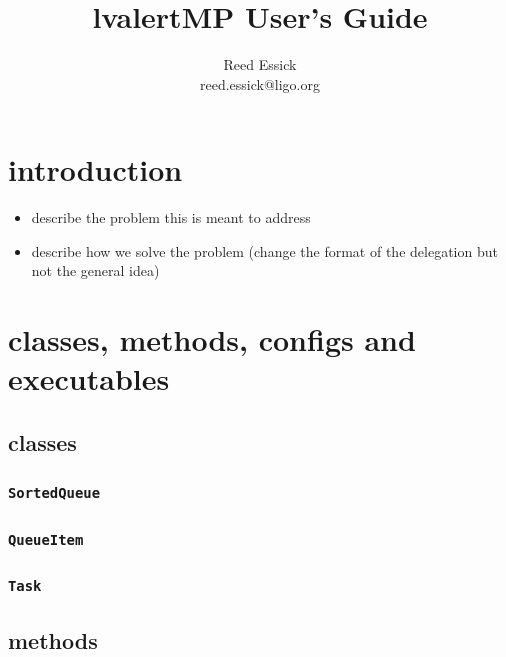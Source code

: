 \documentclass{article}
\newcommand{\SortedQueue}{\texttt{SortedQueue}~}
\newcommand{\QueueItem}{\texttt{QueueItem}~}
\newcommand{\Task}{\texttt{Task}~}
\begin{document}

\title{
lvalertMP User's Guide
}

\author{
Reed Essick \\
reed.essick@ligo.org
}

\maketitle


\section{introduction}

\begin{itemize}
    \item{describe the problem this is meant to address}
    \item{describe how we solve the problem (change the format of the delegation but not the general idea)}
\end{itemize}


\section{classes, methods, configs and executables}


\subsection{classes}

\subsubsection{\SortedQueue}

\subsubsection{\QueueItem}

\subsubsection{\Task}


\subsection{methods}
\end{document}
